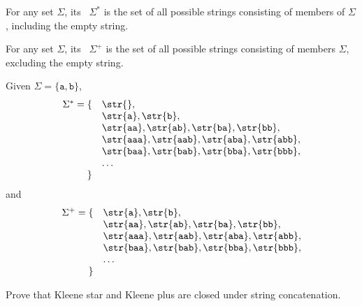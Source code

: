 \begin{flex}
\label{grp:def:bg::sets-and-relations::kleene-operators}

\begin{definition}
\label{def:bg::sets-and-relations::kleene-operators}
For any set $\Sigma$, its~ $\Sigma^*$ is the set of
all possible strings consisting of members of $\Sigma$, including the
empty string.

For any set $\Sigma$, its~ $\Sigma^+$ is the set of
all possible strings consisting of members $\Sigma$, excluding the
empty string.

\end{definition}

\begin{example}
\label{xmpl:bg::sets-and-relations::given}
Given $\Sigma = \{\texttt{a},\texttt{b}\}$,
\[
\begin{array}{rl}
\Sigma^* 
= 
\{
&
\str{}, 
\\
&
\str{\texttt{a}}, \str{\texttt{b}}, 
\\
&
\str{\texttt{aa}}, \str{\texttt{ab}}, 
\str{\texttt{ba}}, \str{\texttt{bb}}, 
\\
&
\str{\texttt{aaa}}, \str{\texttt{aab}}, \str{\texttt{aba}},
\str{\texttt{abb}},
\\
& \str{\texttt{baa}}, \str{\texttt{bab}}, \str{\texttt{bba}}, \str{\texttt{bbb}},
\\
&
\ldots
\\
\} &
\end{array}
\]
and
\[
\begin{array}{rl}
\Sigma^+ 
= 
\{
&
\str{\texttt{a}}, \str{\texttt{b}}, 
\\
&
\str{\texttt{aa}}, \str{\texttt{ab}}, 
\str{\texttt{ba}}, \str{\texttt{bb}}, 
\\
&
\str{\texttt{aaa}}, \str{\texttt{aab}}, \str{\texttt{aba}}, \str{\texttt{abb}}, 
\\
&
\str{\texttt{baa}}, \str{\texttt{bab}}, \str{\texttt{bba}}, 
\str{\texttt{bbb}},
\\
& \ldots
\\
\} & 
\\
\end{array}
\]

\end{example}
\end{flex}

\begin{cluster}
\label{grp:xrcs:bg::sets-and-relations::prove}

\begin{exercise}
\label{xrcs:bg::sets-and-relations::prove}
Prove that Kleene star and Kleene plus are closed under
string concatenation. 

\end{exercise}
\end{cluster}


